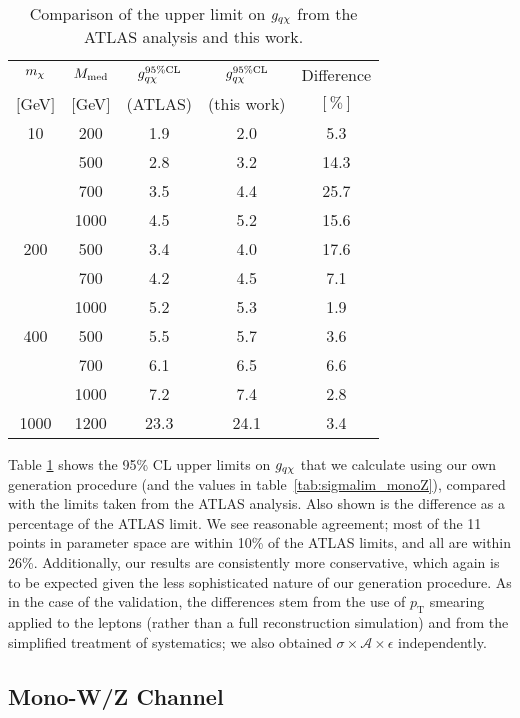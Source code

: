 \begin{table}
\begin{center}
\begin{tabular}{ c | c | c | c | c }
\hline
\hline
$m_{\chi}$ & $M_{\mathrm{med}}$ & $g_{q \chi}^{95\%\mathrm{CL}}$ & $g_{q \chi}^{95\%\mathrm{CL}}$ & Difference \T \\
$[$GeV$]$ & $[$GeV$]$ & (ATLAS) & (this work) & $[\%]$ \B \\
\hline
10 & 200 & 1.9 & 2.0 & 5.3 \T \\
 & 500 & 2.8 & 3.2 & 14.3 \\
 & 700 & 3.5 & 4.4 & 25.7 \\
 & 1000 & 4.5 & 5.2 & 15.6 \\
200 & 500 & 3.4 & 4.0 & 17.6 \T \\
 & 700 & 4.2 & 4.5 & 7.1 \\
 & 1000 & 5.2 & 5.3 & 1.9 \\
400 & 500 & 5.5 & 5.7 & 3.6 \T \\
 & 700 & 6.1 & 6.5 & 6.6 \\
 & 1000 & 7.2 & 7.4 & 2.8 \\
1000 & 1200 & 23.3 & 24.1 & 3.4 \T \B \\
\hline
\hline
\end{tabular}
\end{center}
\caption{Comparison of the upper limit on $g_{q \chi}$ from the ATLAS analysis \cite{Aad:2014monoZlep} and this work.}
\label{tab:monoZvalidation}
\end{table}

Table \ref{tab:monoZvalidation} shows the 95\% CL upper limits on $g_{q \chi}$ that we calculate using our own generation procedure (and the values in table~\ref{tab:sigmalim_monoZ}), compared with the limits taken from the ATLAS analysis. Also shown is the difference as a percentage of the ATLAS limit. We see reasonable agreement; most of the 11 points in parameter space are within 10\% of the ATLAS limits, and all are within 26\%. Additionally, our results are consistently more conservative, which again is to be expected given the less sophisticated nature of our generation procedure. As in the case of the \monojet validation, the differences stem from the use of $p_{\mathrm{T}}$ smearing applied to the leptons (rather than a full reconstruction simulation) and from the simplified treatment of systematics; we also obtained $\sigma \times \mathcal{A} \times \epsilon$ independently.

\subsection{Mono-W/Z Channel}
\label{monoWZ_validation}

